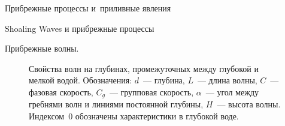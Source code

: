 \begin{chapter}{Прибрежные процессы и~приливные явления}
\begin{section}{Shoaling Waves и прибрежные процессы}
\begin{paragraph}{Прибрежные волны.}
\begin{figure}[t!]
\caption{Свойства волн на глубинах, промежуточных между глубокой и мелкой 
водой. Обозначения: $d$~--- глубина, $L$~--- длина волны, $C$~--- фазовая
скорость, $C_g$~--- групповая скорость, $\alpha$~--- угол между гребнями
волн и линиями постоянной глубины, $H$~--- высота волны. 
Индексом~$0$ обозначены характеристики в глубокой 
воде.~\cite[табл.~A1]{Wiegel:1964}}
\label{wiegelgraph}
\end{figure}
%
%


\end{paragraph}
\end{section}
\end{chapter}

